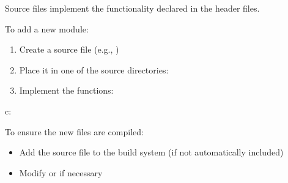 \documentclass[letterpaper,10pt,english]{sphinxmanual}
\begin{document}
\sphinxAtStartPar
{}

\sphinxAtStartPar
Source files implement the functionality declared in the header files.

\sphinxAtStartPar
To add a new module:
\begin{enumerate}
%
\item {} 
\sphinxAtStartPar
Create a source file (e.g., )

\item {} 
\sphinxAtStartPar
Place it in one of the source directories:

\begin{sphinxVerbatim}[commandchars=\\\{\}]
\end{sphinxVerbatim}

\item {} 
\sphinxAtStartPar
Implement the functions:

\end{enumerate}

\sphinxAtStartPar
c:

\begin{sphinxVerbatim}[commandchars=\\\{\}]
     
  
  \PYG{p}{[}\PYG{p}{]}  
\end{sphinxVerbatim}

\sphinxAtStartPar
{}

\sphinxAtStartPar
To ensure the new files are compiled:
\begin{itemize}
\item {} 
\sphinxAtStartPar
Add the source file to the build system (if not automatically included)

\item {} 
\sphinxAtStartPar
Modify  or  if necessary

\end{itemize}
\end{document}

